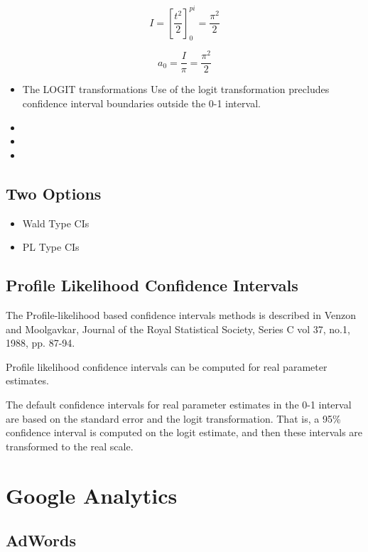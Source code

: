 \documentclass[12pt]{article} %
\begin{document}
\[ I = \left[ \frac{t^2}{2}  \right]^{pi}_{0} = \frac{\pi^2}{2} \]

\[ a_0 = \frac{I}{\pi}  = \frac{\pi^2}{2} \]


\begin{itemize}
\item The LOGIT transformations
Use of the logit transformation precludes confidence interval boundaries outside the 0-1 interval. 
\item 
\item
\item
\end{itemize}

\subsection{Two Options }
\begin{itemize}
\item Wald Type CIs
\item PL Type CIs
\end{itemize}

\subsection{Profile Likelihood Confidence Intervals}
The Profile-likelihood based confidence intervals methods is described in Venzon and Moolgavkar, Journal of the Royal Statistical Society, Series C vol 37, no.1, 1988, pp. 87-94. 

Profile likelihood confidence intervals can be computed for real parameter estimates.

The default confidence intervals for real parameter estimates in the 0-1 interval are based on the standard error and the logit transformation.  
That is, a 95\% confidence interval is computed on the logit estimate, and then these intervals are transformed to the real scale.  


\newpage
\section{Google Analytics}
\subsection{AdWords}
\end{document}

